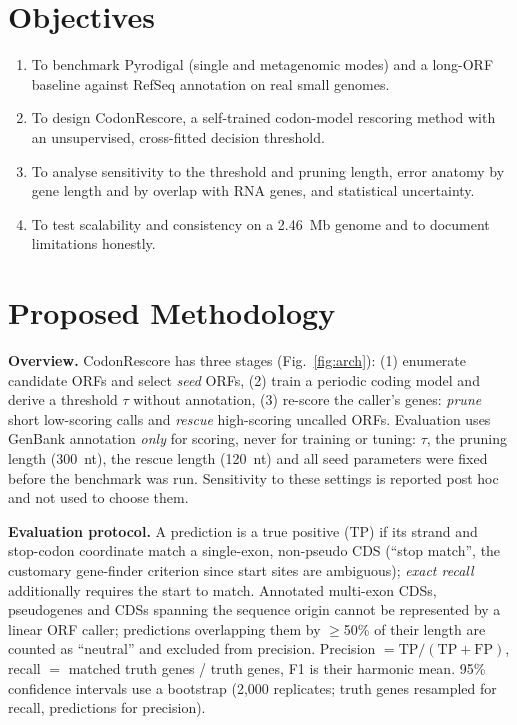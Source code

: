 \section{Objectives}
\begin{enumerate}
\item To benchmark Pyrodigal (single and metagenomic modes) and a long-ORF baseline against RefSeq annotation on real small genomes.
\item To design CodonRescore, a self-trained codon-model rescoring method with an unsupervised, cross-fitted decision threshold.
\item To analyse sensitivity to the threshold and pruning length, error anatomy by gene length and by overlap with RNA genes, and statistical uncertainty.
\item To test scalability and consistency on a 2.46~Mb genome and to document limitations honestly.
\end{enumerate}

\section{Proposed Methodology}
\textbf{Overview.} CodonRescore has three stages (Fig.~\ref{fig:arch}): (1) enumerate candidate ORFs and select \emph{seed} ORFs, (2) train a periodic coding model and derive a threshold $\tau$ without annotation, (3) re-score the caller's genes: \emph{prune} short low-scoring calls and \emph{rescue} high-scoring uncalled ORFs. Evaluation uses GenBank annotation \emph{only} for scoring, never for training or tuning: $\tau$, the pruning length (300~nt), the rescue length (120~nt) and all seed parameters were fixed before the benchmark was run. Sensitivity to these settings is reported post hoc and not used to choose them.

\textbf{Evaluation protocol.} A prediction is a true positive (TP) if its strand and stop-codon coordinate match a single-exon, non-pseudo CDS (``stop match'', the customary gene-finder criterion since start sites are ambiguous); \emph{exact recall} additionally requires the start to match. Annotated multi-exon CDSs, pseudogenes and CDSs spanning the sequence origin cannot be represented by a linear ORF caller; predictions overlapping them by $\geq$50\% of their length are counted as ``neutral'' and excluded from precision. Precision $=\mathrm{TP}/(\mathrm{TP}+\mathrm{FP})$, recall $=$ matched truth genes / truth genes, F1 is their harmonic mean. 95\% confidence intervals use a bootstrap (2,000 replicates; truth genes resampled for recall, predictions for precision).

